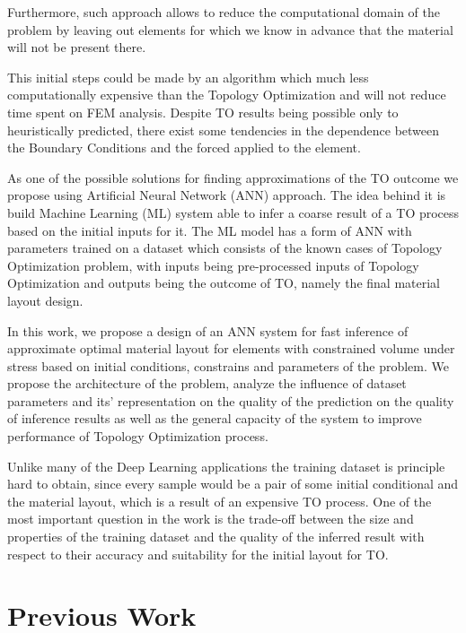 Furthermore, such approach allows to reduce the computational domain of the problem by leaving out elements for which we know in advance that the material will not be present there. 
\medskip
{}

This initial steps could be made by an algorithm which much less computationally expensive than the Topology Optimization and will not reduce time spent on FEM analysis. 
Despite TO results being possible only to heuristically predicted, there exist some tendencies in the dependence between the Boundary Conditions and the forced applied to the element. 
\medskip

As one of the possible solutions for finding approximations of the TO outcome we propose using Artificial Neural Network (ANN) approach.
The idea behind it is build Machine Learning (ML) system able to infer a coarse result of a TO process based on the initial inputs for it.
The ML model has a form of ANN with parameters trained on a dataset which consists of the known cases of Topology Optimization problem, with inputs being pre-processed inputs of Topology Optimization and outputs being the outcome of TO, namely the final material layout design.
\medskip

In this work, we propose a design of an ANN system for fast inference of approximate optimal material layout for elements with constrained volume under stress based on initial conditions, constrains and parameters of the problem. 
We propose the architecture of the problem, analyze the influence of dataset parameters and its' representation on the quality of the prediction on the quality of inference results as well as the general capacity of the system to improve performance of Topology Optimization process.  
\medskip

Unlike many of the Deep Learning applications the training dataset is principle hard to obtain, since every sample would be a pair of some initial conditional and the material layout, which is a result of an expensive TO process. 
One of the most important question in the work is the trade-off between the size and properties of the training dataset and the quality of the inferred result with respect to their accuracy and suitability for the initial layout for TO.


\section{Previous Work}



